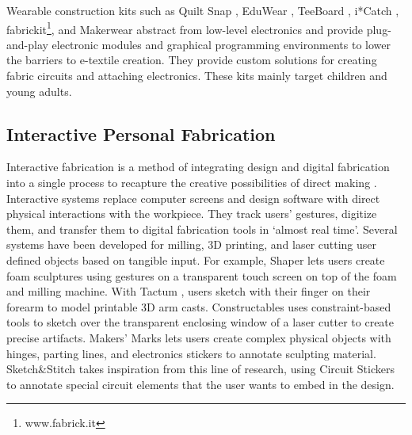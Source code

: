 Wearable construction kits such as Quilt Snap \cite{buechley2005quilt}, EduWear \cite{katterfeldt2009eduwear}, TeeBoard \cite{ngai2009teeboard}, i*Catch \cite{ngai2010catch}, fabrickit\footnote{www.fabrick.it}, and Makerwear \cite{kazemitabaar2017makerwear} abstract from low-level electronics and provide plug-and-play electronic modules and graphical programming environments to lower the barriers to e-textile creation. They provide custom solutions for creating fabric circuits and attaching electronics. These kits mainly target children and young adults.










\subsection{Interactive Personal Fabrication}
Interactive fabrication is a method of integrating design and digital fabrication into a single process to recapture the creative possibilities of direct making \cite{willis2011interactive}. Interactive systems replace computer screens and design software with direct physical interactions with the workpiece. They track users' gestures, digitize them, and transfer them to digital fabrication tools in `almost real time'. Several systems have been developed for milling, 3D printing, and laser cutting user defined objects based on tangible input. For example, Shaper \cite{willis2011interactive} lets users create foam sculptures using gestures on a transparent touch screen on top of the foam and milling machine. %
With Tactum \cite{gannon2015tactum}, users sketch with their finger on their forearm to model printable 3D arm casts. Constructables \cite{mueller2012interactive} uses constraint-based tools to sketch over the transparent enclosing window of a laser cutter to create precise artifacts. Makers' Marks \cite{savage2015makers} lets users create complex physical objects with hinges, parting lines, and electronics stickers to annotate sculpting material.
Sketch\&Stitch takes inspiration from this line of research, using Circuit Stickers to annotate special circuit elements that the user wants to embed in the design.


